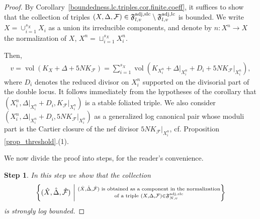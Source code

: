 \documentclass[12pt, a4paper]{amsart}
\DeclareMathOperator{\vol}{\mathrm{vol}}
\newcommand{\setfoliation}[1]{\mathfrak F^{\rm adj, #1}_{N, v}}
\theoremstyle{definition}
\theoremstyle{named}
\begin{document}
	\begin{proof}
		By Corollary~\ref{boundedness.lc.triples.cor.finite.coeff},
		it suffices to show that the collection of triples
		$(X,  \Delta, \mathcal F) \in 
		\mathfrak{F}^{\rm adj, slc}_{l, v} 
		\setminus
		\mathfrak{F}^{\rm adj, lc}_{l, v}$ is bounded. 
		We write
		$X=\cup_{i=1}^{s_X} X_i$
		as a union its irreducible components, and denote by
		$n \colon X^n \to X$
		the normalization of 
		$X$, 
		$X^n = \sqcup_{i=1}^{s_X} X_i^n$.
		
		Then,
		\begin{align}
			\label{eqn.vol.slc}
			v=
			\vol(K_X+\Delta+5NK_\mathcal{F})=
			\sum_{i=1}^{s_X}
			\vol(K_{X_i^n }+\Delta\vert_{X^n_i}+D_i+5NK_\mathcal{F}\vert_{X_i^n}), 
		\end{align}
		where 
		$D_i$
		denotes the reduced divisor on 
		$X_i^n$
		supported on the divisorial part of the  double locus.
		It follows immediately from the hypotheses of the corollary that 
		$(X_i^n, \Delta\vert_{X^n_i}+D_i, K_\mathcal{F}\vert_{X^n_i})$
		is a stable foliated triple. 
		We also consider 
		$(X_i^n, \Delta\vert_{X^n_i}+D_i, 5NK_\mathcal{F}\vert_{X^n_i})$ 
		as a generalized log canonical pair whose moduli part is the Cartier closure of the nef divisor
		$5NK_\mathcal{F}\vert_{X^n_i}$, cf. Proposition \ref{prop_threshold}.(1).
		
		We now divide the proof into steps, for the reader's convenience.
		
		\medskip
		
		{\bf Step 1}.
		{\it In this step we show that the collection
			\begin{align*}
			\left \{
			(\hat{X}, \hat{\Delta}, \hat{\mathcal{F}}) \
			\middle \vert \
			\substack{
			(\hat{X}, \hat{\Delta}, \hat{\mathcal{F}})
			\text{ is obtained as a component in the normalization}
			\\
			\text{of a triple }
			(X, \Delta, \mathcal F) \in \setfoliation{slc}}
			\right \}
		\end{align*}
		is strongly log bounded.}
		

\end{proof}
\end{document}

